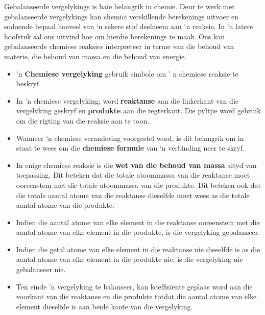 Gebalanseerde vergelykings is baie belangrik in chemie. Deur te werk met gebalanseerde vergelykings kan chemici  verskillende berekenings uitvoer en sodoende bepaal hoeveel van ‘n sekere stof deelneem aan ‘n reaksie. In 'n latere hoofstuk sal ons uitvind hoe om hierdie berekenings te maak. Ons kan gebalanseerde chemiese reaksies interpreteer in terme van die behoud van materie, die behoud van massa en die behoud van energie.

            \nopagebreak
      \label{m38727*id67171}\begin{itemize}[noitemsep]
            \label{m38727*uid36}\item 'n \textbf{Chemiese vergelyking} gebruik simbole om ' n chemiese reaksie te beskryf.
\label{m38727*uid37}\item In 'n chemiese vergelyking, word \textbf{reaktanse} aan die linkerkant van die vergelyking geskryf en \textbf{produkte} aan die regterkant. Die pyltjie word gebruik om die rigting van die reaksie aan te toon.
\label{m38727*uid38}\item Wanneer ‘n chemiese verandering voorgestel word, is dit belangrik om in staat te wees om die \textbf{chemiese formule} van ‘n verbinding neer te skryf.
\label{m38727*uid39}\item In enige chemiese reaksie is die \textbf{wet van die behoud van massa} altyd van toepassing. Dit beteken dat die totale atoommassa van die reaktanse moet ooreenstem met die totale atoommassa van die produkte. Dit beteken ook dat die totale aantal atome van die reaktanse dieselfde moet wees as die totale aantal atome van die produkte.
\label{m38727*uid41}\item Indien die aantal atome van elke element in die reaktanse ooreenstem met die aantal atome van elke element in die produkte, is die vergelyking gebalanseer.
\label{m38727*uid42}\item Indien die getal atome van elke element in die reaktanse nie dieselfde is as die aantal atome van elke element in die produkte nie, is die vergelyking nie gebalanseer nie.
\item Ten einde 'n vergelyking te balanseer,  kan koëffisiënte geplaas word aan die voorkant van die reaktanse en die  produkte totdat die aantal atome van elke element dieselfde is aan beide kante van die vergelyking.
\end{itemize}


